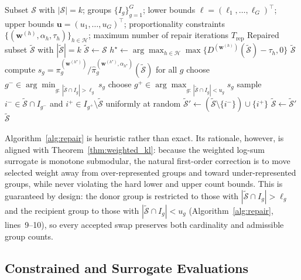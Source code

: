 \documentclass[10pt,journal]{IEEEtran}
\newcommand{\1}{\mathbf{1}}
\newcommand{\bw}{\mathbf{w}}
\newcommand{\Sel}{\mathcal{S}}
\theoremstyle{ieeethm}
\begin{document}
\begin{algorithm}[t]
\caption{Swap-Based Repair for  Proportionality Constraints}
\label{alg:repair}
\begin{algorithmic}[1]
\Require
Subset $\Sel$ with $|\Sel|=k$; groups $\{I_g\}_{g=1}^{G}$; lower bounds $\boldsymbol{\ell}=(\ell_1,\dots,\ell_G)^\top$; upper bounds $\mathbf u=(u_1,\dots,u_G)^\top$; proportionality constraints $\{(\bw^{(h)},\alpha_h,\tau_h)\}_{h\in\mathcal H}$; maximum number of repair iterations $T_{\mathrm{rep}}$
\Ensure
Repaired subset $\widetilde{\Sel}$ with $|\widetilde{\Sel}|=k$
\State $\widetilde{\Sel}\gets \Sel$
    \State $h^\star\gets \arg\max_{h\in\mathcal H}\max\{D^{(\bw^{(h)})}(\widetilde{\Sel})-\tau_h,0\}$
    \If{$D^{(\bw^{(h^\star)})}(\widetilde{\Sel})\le \tau_{h^\star}$}
        \State \Return $\widetilde{\Sel}$ 
    \EndIf
    \State compute $s_g=\pi_g^{(\bw^{(h^\star)})}/\widehat{\pi}_g^{(\bw^{(h^\star)},\alpha_{h^\star})}(\widetilde{\Sel})$ for all $g$
    \State choose $g^{-}\in\arg\min_{g:\ |\widetilde{\Sel}\cap I_g|>\ell_g} s_g$ 
    \State choose $g^{+}\in\arg\max_{g:\ |\widetilde{\Sel}\cap I_g|<u_g} s_g$ 
    \State sample $i^{-}\in \widetilde{\Sel}\cap I_{g^{-}}$ and $i^{+}\in I_{g^{+}}\setminus \widetilde{\Sel}$ uniformly at random
    \State $\widetilde{\Sel}'\gets (\widetilde{\Sel}\setminus\{i^{-}\})\cup\{i^{+}\}$ 
    \If{$V(\widetilde{\Sel}')<V(\widetilde{\Sel})$}
        \State $\widetilde{\Sel}\gets \widetilde{\Sel}'$ 
    \Else
        \Break 
    \EndIf
\EndFor
\State \Return $\widetilde{\Sel}$
\end{algorithmic}
\end{algorithm}

Algorithm~\ref{alg:repair} is heuristic rather than exact. Its rationale, however, is aligned with Theorem~\ref{thm:weighted_kl}: because the weighted log-sum surrogate is monotone submodular, the natural first-order correction is to move selected weight away from over-represented groups and toward under-represented groups, while never violating the hard lower and upper count bounds. This is guaranteed by design: the donor group is restricted to those with $|\widetilde{\Sel}\cap I_g|>\ell_g$ and the recipient group to those with $|\widetilde{\Sel}\cap I_g|<u_g$ (Algorithm~\ref{alg:repair}, lines~9--10), so every accepted swap preserves both cardinality and admissible group counts.

\subsection{Constrained  and Surrogate Evaluations}
\label{subsec:algo_nsga}
\end{document}
